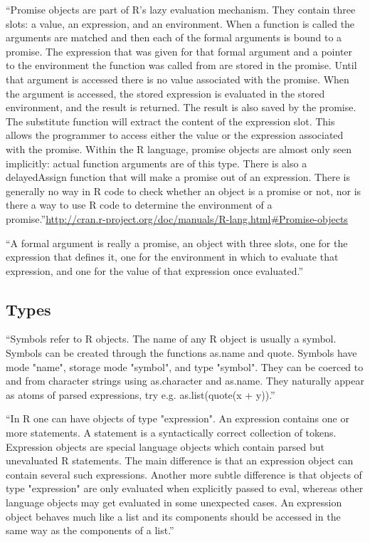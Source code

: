 ``Promise objects are part of R’s lazy evaluation mechanism. They contain three slots: a value, an expression, and an environment. When a function is called the arguments are matched and then each of the formal arguments is bound to a promise. The expression that was given for that formal argument and a pointer to the environment the function was called from are stored in the promise.
Until that argument is accessed there is no value associated with the promise. When the argument is accessed, the stored expression is evaluated in the stored environment, and the result is returned. The result is also saved by the promise. The substitute function will extract the content of the expression slot. This allows the programmer to access either the value or the expression associated with the promise.
Within the R language, promise objects are almost only seen implicitly: actual function arguments are of this type. There is also a delayedAssign function that will make a promise out of an expression. There is generally no way in R code to check whether an object is a promise or not, nor is there a way to use R code to determine the environment of a promise.''\url{http://cran.r-project.org/doc/manuals/R-lang.html#Promise-objects}

``A formal argument is really a promise, an object with three slots, one for the expression that defines it, one for the environment in which to evaluate that expression, and one for the value of that expression once evaluated.''

\subsection{Types}
\label{sect:}


``Symbols refer to R objects. The name of any R object is usually a symbol. Symbols can be created through the functions as.name and quote.
Symbols have mode "name", storage mode "symbol", and type "symbol". They can be coerced to and from character strings using as.character and as.name. They naturally appear as atoms of parsed expressions, try e.g. as.list(quote(x + y)).''

``In R one can have objects of type "expression". An expression contains one or more statements. A statement is a syntactically correct collection of tokens. Expression objects are special language objects which contain parsed but unevaluated R statements. The main difference is that an expression object can contain several such expressions. Another more subtle difference is that objects of type "expression" are only evaluated when explicitly passed to eval, whereas other language objects may get evaluated in some unexpected cases.
An expression object behaves much like a list and its components should be accessed in the same way as the components of a list.''

